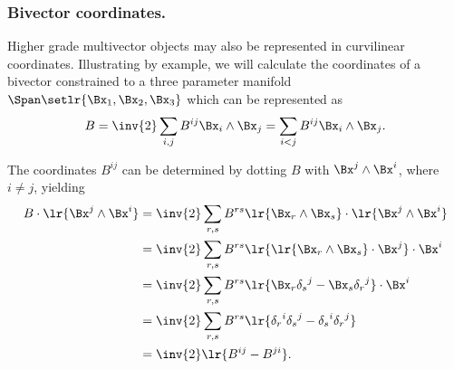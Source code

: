 %
%
\subsubsection{Bivector coordinates.}
Higher grade multivector objects may also be represented in curvilinear coordinates.  Illustrating by example, we will calculate the coordinates of a
bivector constrained to a three parameter manifold \( \Span \setlr{ \Bx_1, \Bx_2, \Bx_3 } \) which can be represented as
\begin{equation}\label{eqn:curvilinearDefinedCoordinates:320}
B
= \inv{2} \sum_{i, j} B^{ij} \Bx_{i} \wedge \Bx_{j}
= \sum_{i < j} B^{ij} \Bx_{i} \wedge \Bx_{j}.
\end{equation}

The coordinates \( B^{ij} \) can be determined by dotting \( B \) with \( \Bx^{j} \wedge \Bx^{i} \), where \( i \ne j \), yielding
\begin{equation}\label{eqn:curvilinearDefinedCoordinates:340}
\begin{aligned}
B \cdot \lr{ \Bx^{j} \wedge \Bx^{i} }
&= \inv{2} \sum_{r, s} B^{rs} \lr{ \Bx_{r} \wedge \Bx_{s} } \cdot \lr{ \Bx^{j} \wedge \Bx^{i} } \\
&= \inv{2} \sum_{r, s} B^{rs} \lr{ \lr{ \Bx_{r} \wedge \Bx_{s} } \cdot \Bx^{j} } \cdot \Bx^{i} \\
&= \inv{2} \sum_{r, s} B^{rs} \lr{ \Bx_{r} {\delta_s}^j - \Bx_{s} {\delta_r}^j } \cdot \Bx^{i} \\
&= \inv{2} \sum_{r, s} B^{rs} \lr{ {\delta_r}^i {\delta_s}^j - {\delta_s}^i {\delta_r}^j } \\
&= \inv{2} \lr{ B^{i j} - B^{j i} }.
\end{aligned}
\end{equation}

